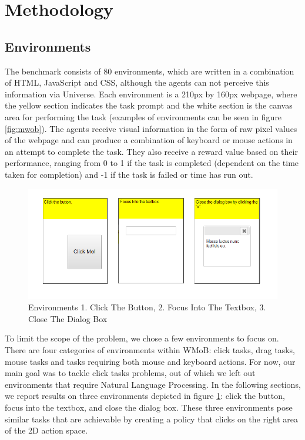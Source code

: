 \documentclass[10pt,journal,compsoc]{IEEEtran}
\begin{document}
\section{Methodology}

\subsection{Environments}

The benchmark consists of 80 environments, which are written in a combination of HTML, JavaScript and CSS, although the agents can not perceive this information via Universe. Each environment is a 210px by 160px webpage, where the yellow section indicates the task prompt and the white section is the canvas area for performing the task (examples of environments can be seen in figure \ref{fig:mwob}). The agents receive visual information in the form of raw pixel values of the webpage and can produce a combination of keyboard or mouse actions in an attempt to complete the task. They also receive a reward value based on their performance, ranging from 0 to 1 if the task is completed (dependent on the time taken for completion) and -1 if the task is failed or time has run out.

\begin{figure}[t!]
	\includegraphics[width=\linewidth]{chosen-envi.png}
	\caption{Environments 1. Click The Button, 2. Focus Into The Textbox, 3. Close The Dialog Box}
	\label{fig:chosen-envi}
\end{figure}

To limit the scope of the problem, we chose a few environments to focus on. There are four categories of environments within WMoB: click tasks, drag tasks, mouse tasks and tasks requiring both mouse and keyboard actions. For now, our main goal was to tackle click tasks problems, out of which we left out environments that require Natural Language Processing. In the following sections, we report results on three environments depicted in figure \ref{fig:chosen-envi}: click the button, focus into the textbox, and close the dialog box. These three environments pose similar tasks that are achievable by creating a policy that clicks on the right area of the 2D action space.
\end{document}
